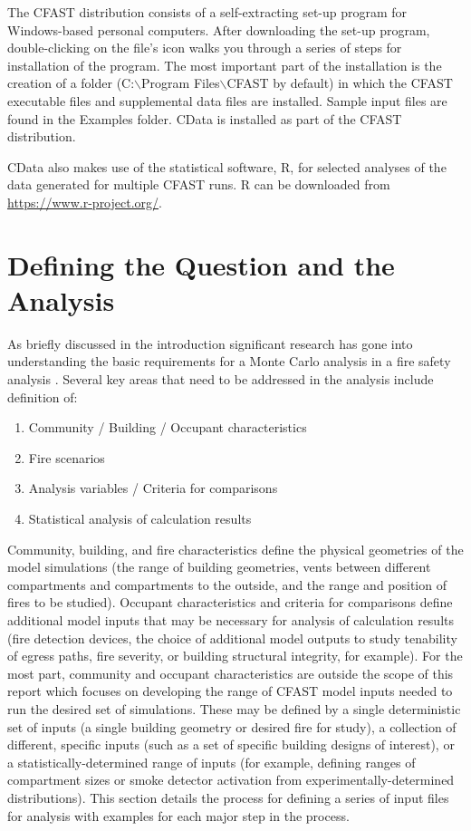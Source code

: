 \documentclass[12pt,twoside]{book}
\begin{document}
The CFAST distribution consists of a self-extracting set-up program for Windows-based personal computers. After downloading the set-up program, double-clicking on the file's icon walks you through a series of steps for installation of the program.  The most important part of the installation is the creation of a folder ({\ct C:$\backslash$Program Files$\backslash$CFAST} by default) in which the CFAST executable files and supplemental data files are installed.  Sample input files are found in the {\ct Examples} folder. CData is installed as part of the CFAST distribution.

CData also makes use of the statistical software, R, for selected analyses of the data generated for multiple CFAST runs. R can be downloaded from \url{https://www.r-project.org/}.

%
%

\section{Defining the Question and the Analysis}

As briefly discussed in the introduction significant research has gone into understanding the basic requirements for a Monte Carlo analysis in a fire safety analysis \cite{Bukowski_1985,Clarke_1990,NFPA_5000,Hurley_2016,bruns_tn_2016}. Several key areas that need to be addressed in the analysis include definition of:

\begin{enumerate}
  \item Community / Building / Occupant characteristics
  \item Fire scenarios
  \item Analysis variables / Criteria for comparisons
  \item Statistical analysis of calculation results
\end{enumerate}

Community, building, and fire characteristics define the physical geometries of the model simulations (the range of building geometries, vents between different compartments and compartments to the outside, and the range and position of fires to be studied). Occupant characteristics and criteria for comparisons define additional model inputs that may be necessary for analysis of calculation results (fire detection devices, the choice of additional model outputs to study tenability of egress paths, fire severity, or building structural integrity, for example). For the most part, community and occupant characteristics are outside the scope of this report which focuses on developing the range of CFAST model inputs needed to run the desired set of simulations. These may be defined by a single deterministic set of inputs (a single building geometry or desired fire for study), a collection of different, specific inputs (such as a set of specific building designs of interest), or a statistically-determined range of inputs (for example, defining ranges of compartment sizes or smoke detector activation from experimentally-determined distributions). This section details the process for defining a series of input files for analysis with examples for each major step in the process.
\end{document}
